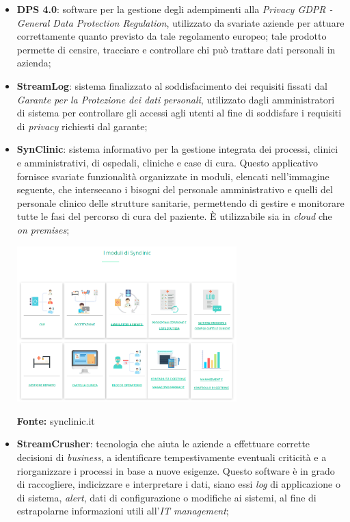 \begin{itemize}
  \item \textbf{DPS 4.0}: software per la gestione degli adempimenti alla \textit{Privacy GDPR - General Data Protection Regulation}, utilizzato da svariate aziende per attuare correttamente quanto previsto da tale regolamento europeo; tale prodotto permette di censire, tracciare e controllare chi può trattare dati personali in azienda;

  \item \textbf{StreamLog}: sistema finalizzato al soddisfacimento dei requisiti fissati dal \textit{Garante per la Protezione dei dati personali}, utilizzato dagli amministratori di sistema per controllare gli accessi agli utenti al fine di soddisfare i requisiti di \textit{privacy} richiesti dal garante;

  \item \textbf{SynClinic}: sistema informativo per la gestione integrata dei processi, clinici e amministrativi, di ospedali, cliniche e case di cura. Questo applicativo fornisce svariate funzionalità organizzate in moduli, elencati nell'immagine seguente, che intersecano i bisogni del personale amministrativo e quelli del personale clinico delle strutture sanitarie, permettendo di gestire e monitorare tutte le fasi del percorso di cura del paziente. È utilizzabile sia in \textit{cloud} che \textit{on premises};

  \begin{minipage}{\linewidth}
    \centering
      \includegraphics[height=6cm]{immagini/synclinic}
    \caption*{\textbf{Fonte:} synclinic.it}
  \end{minipage}

  \item \textbf{StreamCrusher}: tecnologia che aiuta le aziende a effettuare corrette decisioni di \textit{business}, a identificare tempestivamente eventuali criticità e a riorganizzare i processi in base a nuove esigenze. Questo software è in grado di raccogliere, indicizzare e interpretare i dati, siano essi \textit{log} di applicazione o di sistema, \textit{alert}, dati di configurazione o modifiche ai sistemi, al fine di estrapolarne informazioni utili all'\textit{IT management};


\end{itemize}
